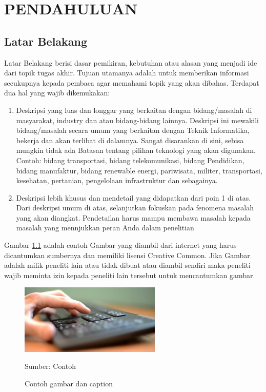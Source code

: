 \newpage
\pagestyle{fancy}
\fancyhf{}
\fancyhead[R]{\thepage}
\chapter{PENDAHULUAN} \label{Bab I}

\section{Latar Belakang} \label{I.Latar Belakang}
Latar Belakang berisi dasar pemikiran, kebutuhan atau alasan yang menjadi ide dari topik tugas akhir. Tujuan utamanya adalah untuk memberikan informasi secukupnya kepada pembaca agar memahami topik yang akan dibahas. Terdapat dua hal yang wajib dikemukakan: \par
\begin{enumerate}[noitemsep]
	\item Deskripsi yang luas dan longgar yang berkaitan dengan bidang/masalah di masyarakat, industry dan atau bidang-bidang lainnya. Deskripsi ini mewakili bidang/masalah secara umum yang berkaitan dengan Teknik Informatika, bekerja dan akan terlibat di dalamnya. Sangat disarankan di sini, sebisa mungkin tidak ada Batasan tentang pilihan teknologi yang akan digunakan. Contoh: bidang transportasi, bidang telekomunikasi, bidang Pendidikan, bidang manufaktur, bidang renewable energi, pariwisata, militer, transportasi, kesehatan, pertanian, pengelolaan infrastruktur dan sebagainya.
	\item Deskripsi lebih khusus dan mendetail yang didapatkan dari poin 1 di atas. Dari deskripsi umum di atas, selanjutkan fokuskan pada fenomena masalah yang akan diangkat. Pendetailan harus mampu membawa masalah kepada masalah yang mennjukkan peran Anda dalam penelitian 
\end{enumerate}
Gambar \ref{fig:1.contoh} adalah contoh Gambar yang diambil dari internet yang harus dicantumkan sumbernya dan memiliki lisensi Creative Common. Jika Gambar adalah milik peneliti lain atau tidak dibuat atau diambil sendiri maka peneliti wajib meminta izin kepada peneliti lain tersebut untuk mencantumkan gambar. 
\begin{figure}[H] %
	\centering
	\includegraphics[width=0.6\textwidth]{figure/keyboard.jpg}
	\caption{Contoh gambar dan caption}
	\label{fig:1.contoh}
	{\footnotesize Sumber: Contoh}
\end{figure}

